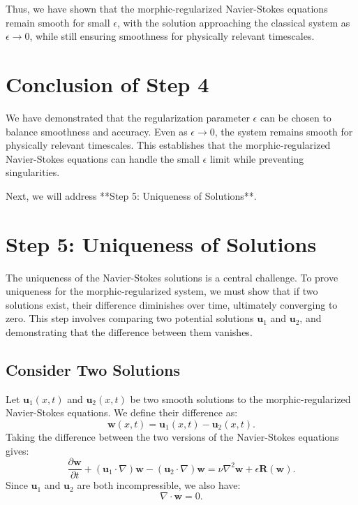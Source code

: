 \documentclass{article}
\begin{document}
Thus, we have shown that the morphic-regularized Navier-Stokes equations remain smooth for small \( \epsilon \), with the solution approaching the classical system as \( \epsilon \to 0 \), while still ensuring smoothness for physically relevant timescales.

\section*{Conclusion of Step 4}

We have demonstrated that the regularization parameter \( \epsilon \) can be chosen to balance smoothness and accuracy. Even as \( \epsilon \to 0 \), the system remains smooth for physically relevant timescales. This establishes that the morphic-regularized Navier-Stokes equations can handle the small \( \epsilon \) limit while preventing singularities.

Next, we will address **Step 5: Uniqueness of Solutions**.

\section*{Step 5: Uniqueness of Solutions}

The uniqueness of the Navier-Stokes solutions is a central challenge. To prove uniqueness for the morphic-regularized system, we must show that if two solutions exist, their difference diminishes over time, ultimately converging to zero. This step involves comparing two potential solutions \( \mathbf{u}_1 \) and \( \mathbf{u}_2 \), and demonstrating that the difference between them vanishes.

\subsection*{Consider Two Solutions}

Let \( \mathbf{u}_1(x,t) \) and \( \mathbf{u}_2(x,t) \) be two smooth solutions to the morphic-regularized Navier-Stokes equations. We define their difference as:
\[
\mathbf{w}(x,t) = \mathbf{u}_1(x,t) - \mathbf{u}_2(x,t).
\]
Taking the difference between the two versions of the Navier-Stokes equations gives:
\[
\frac{\partial \mathbf{w}}{\partial t} + (\mathbf{u}_1 \cdot \nabla) \mathbf{w} - (\mathbf{u}_2 \cdot \nabla) \mathbf{w} = \nu \nabla^2 \mathbf{w} + \epsilon \mathbf{R}(\mathbf{w}).
\]
Since \( \mathbf{u}_1 \) and \( \mathbf{u}_2 \) are both incompressible, we also have:
\[
\nabla \cdot \mathbf{w} = 0.
\]
\end{document}
